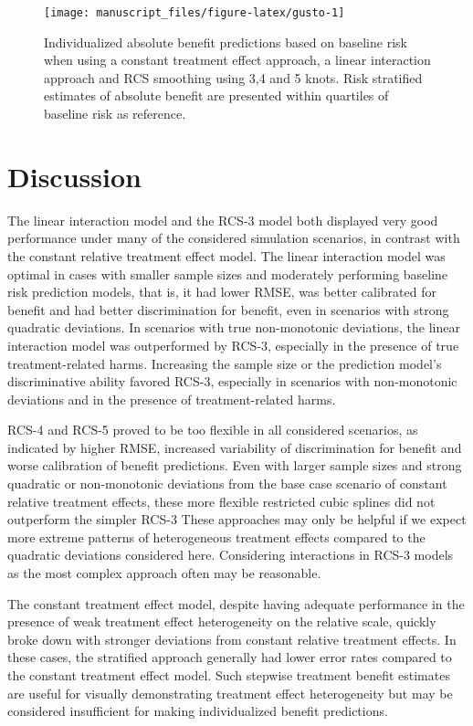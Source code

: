 \documentclass[]{elsarticle} %
\begin{document}
\begin{figure}
\texttt{[image: manuscript\_files/figure-latex/gusto-1]} \caption{Individualized absolute benefit predictions based on baseline risk when using a constant treatment effect approach, a linear interaction approach and RCS smoothing using 3,4 and 5 knots. Risk stratified estimates of absolute benefit are presented within quartiles of baseline risk as reference.}\label{fig:gusto}
\end{figure}

\hypertarget{discussion}{%
\section{Discussion}\label{discussion}}

The linear interaction model and the RCS-3 model both displayed very
good performance under many of the considered simulation scenarios, in
contrast with the constant relative treatment effect model. The linear
interaction model was optimal in cases with smaller sample sizes and
moderately performing baseline risk prediction models, that is, it had
lower RMSE, was better calibrated for benefit and had better
discrimination for benefit, even in scenarios with strong quadratic
deviations. In scenarios with true non-monotonic deviations, the linear
interaction model was outperformed by RCS-3, especially in the presence
of true treatment-related harms. Increasing the sample size or the
prediction model's discriminative ability favored RCS-3, especially in
scenarios with non-monotonic deviations and in the presence of
treatment-related harms.

RCS-4 and RCS-5 proved to be too flexible in all considered scenarios,
as indicated by higher RMSE, increased variability of discrimination for
benefit and worse calibration of benefit predictions. Even with larger
sample sizes and strong quadratic or non-monotonic deviations from the
base case scenario of constant relative treatment effects, these more
flexible restricted cubic splines did not outperform the simpler RCS-3
These approaches may only be helpful if we expect more extreme patterns
of heterogeneous treatment effects compared to the quadratic deviations
considered here. Considering interactions in RCS-3 models as the most
complex approach often may be reasonable.

The constant treatment effect model, despite having adequate performance
in the presence of weak treatment effect heterogeneity on the relative
scale, quickly broke down with stronger deviations from constant
relative treatment effects. In these cases, the stratified approach
generally had lower error rates compared to the constant treatment
effect model. Such stepwise treatment benefit estimates are useful for
visually demonstrating treatment effect heterogeneity but may be
considered insufficient for making individualized benefit predictions.
\end{document}
